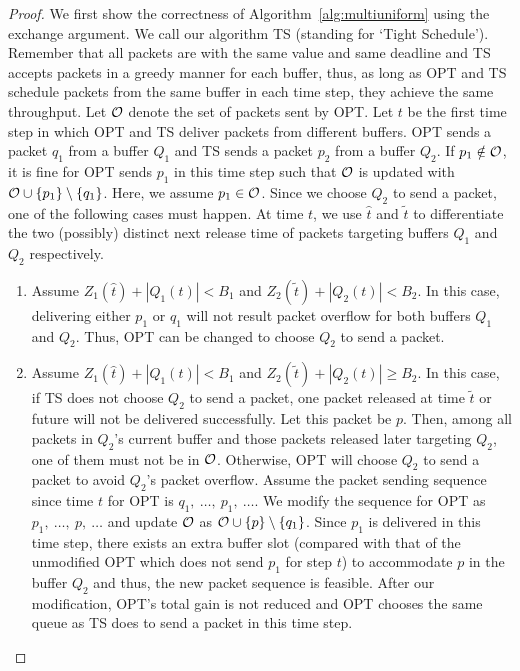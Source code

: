 \documentclass[final, 11pt]{article}
\begin{document}
\begin{proof}
We first show the correctness of Algorithm~\ref{alg:multiuniform} using the exchange argument. We call our algorithm TS (standing for `Tight Schedule'). Remember that all packets are with the same value and same deadline and TS accepts packets in a greedy manner for each buffer, thus, as long as OPT and TS schedule packets from the same buffer in each time step, they achieve the same throughput. Let $\cal O$ denote the set of packets sent by OPT. Let $t$ be the first time step in which OPT and TS deliver packets from different buffers. OPT sends a packet $q_1$ from a buffer $Q_1$ and TS sends a packet $p_2$ from a buffer $Q_2$. If $p_1 \notin \cal O$, it is fine for OPT sends $p_1$ in this time step such that $\cal O$ is updated with ${\cal O} \cup \{p_1\} \setminus \{q_1\}$. Here, we assume $p_1 \in \cal O$. Since we choose $Q_2$ to send a packet, one of the following cases must happen. At time $t$, we use $\hat t$ and $\tilde t$ to differentiate the two (possibly) distinct next release time of packets targeting buffers $Q_1$ and $Q_2$ respectively.

\begin{enumerate}
\item Assume $Z_1({\hat t}) + |Q_1(t)| < B_1$ and $Z_2({\tilde t}) + |Q_2(t)| < B_2$. In this case, delivering either $p_1$ or $q_1$ will not result packet overflow for both buffers $Q_1$ and $Q_2$. Thus, OPT can be changed to choose $Q_2$ to send a packet.

\item Assume $Z_1({\hat t}) + |Q_1(t)| < B_1$ and $Z_2({\tilde t}) + |Q_2(t)| \ge B_2$. In this case, if TS does not choose $Q_2$ to send a packet, one packet released at time ${\tilde t}$ or future will not be delivered successfully. Let this packet be $p$. Then, among all packets in $Q_2$'s current buffer and those packets released later targeting $Q_2$, one of them must not be in $\cal O$. Otherwise, OPT will choose $Q_2$ to send a packet to avoid $Q_2$'s packet overflow. Assume the packet sending sequence since time $t$ for OPT is $q_1, \ \ldots, \ p_1, \ \ldots$. We modify the sequence for OPT as $p_1, \ \ldots, \ p, \ \ldots$ and update $\cal O$ as ${\cal O} \cup \{p\} \setminus \{q_1\}$. Since $p_1$ is delivered in this time step, there exists an extra buffer slot (compared with that of the unmodified OPT which does not send $p_1$ for step $t$) to accommodate $p$ in the buffer $Q_2$ and thus, the new packet sequence is feasible. After our modification, OPT's total gain is not reduced and OPT chooses the same queue as TS does to send a packet in this time step.


\end{enumerate}
\end{proof}
\end{document}
